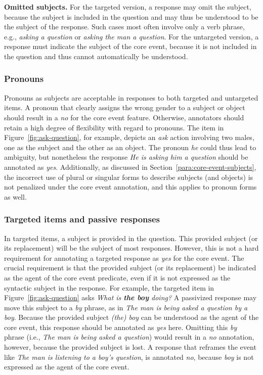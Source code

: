 \documentclass[12pt]{article}
\begin{document}
\textbf{Omitted subjects.} For the targeted version, a response may omit the subject, because the subject is included in the question and may thus be understood to be the subject of the response. Such cases most often involve only a verb phrase, e.g., \textit{asking a question} or \textit{asking the man a question}. For the untargeted version, a response must indicate the subject of the core event, because it is not included in the question and thus cannot automatically be understood.

\subsubsection{Pronouns} Pronouns as subjects are acceptable in responses to both targeted and untargeted items. A pronoun that clearly assigns the wrong gender to a subject or object should result in a \textit{no} for the core event feature. Otherwise, annotators should retain a high degree of flexibility with regard to pronouns. The item in Figure~\ref{fig:ask-question}, for example, depicts an \textit{ask} action involving two males, one as the subject and the other as an object. The pronoun \textit{he} could thus lead to ambiguity, but nonetheless the response \textit{He is asking him a question} should be annotated as \textit{yes}. Additionally, as discussed in Section~\ref{para:core-event-subjects}, the incorrect use of plural or singular forms to describe subjects (and objects) is not penalized under the core event annotation, and this applies to pronoun forms as well. 

\subsubsection{Targeted items and passive responses} \label{sec:core-targeted} In targeted items, a subject is provided in the question. This provided subject (or its replacement) will be the subject of most responses. However, this is not a hard requirement for annotating a targeted response as \textit{yes} for the core event. The crucial requirement is that the provided subject (or its replacement) be indicated as the agent of the core event predicate, even if it is not expressed as the syntactic subject in the response. For example, the targeted item in Figure~\ref{fig:ask-question} asks \textit{What is \textbf{the boy} doing?} A passivized response may move this subject to a \textit{by} phrase, as in \textit{The man is being asked a question by a boy}. Because the provided subject \textit{(the) boy} can be understood as the agent of the core event, this response should be annotated as \textit{yes} here. Omitting this \textit{by} phrase (i.e., \textit{The man is being asked a question}) would result in a \textit{no} annotation, however, because the provided subject is lost. 
A response that reframes the event like \textit{The man is listening to a boy's question}, is annotated \textit{no}, because \textit{boy} is not expressed as the agent of the core event. 
\end{document}
